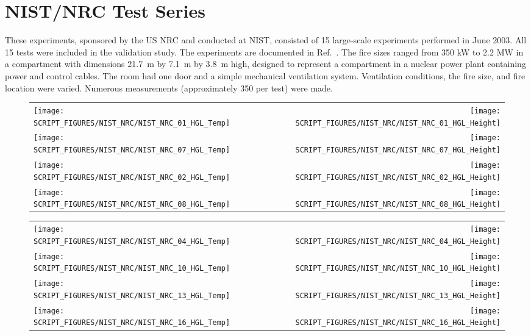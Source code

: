 \clearpage

\section{NIST/NRC Test Series}

These experiments, sponsored by the US NRC and conducted at NIST, consisted of 15 large-scale experiments performed in June 2003. All 15 tests were included in the validation study. The experiments are documented in Ref.~\cite{Hamins:2005}. The fire sizes ranged from 350 kW to 2.2 MW in a compartment with dimensions 21.7~m by 7.1~m by 3.8~m high, designed to represent a compartment in a nuclear power plant containing power and control cables. The room had one door and a simple mechanical ventilation system. Ventilation conditions, the fire size, and fire location were varied. Numerous measurements (approximately 350 per test) were made.

\begin{figure}[p]
\begin{tabular*}{\textwidth}{l@{\extracolsep{\fill}}r}
\texttt{[image: SCRIPT\_FIGURES/NIST\_NRC/NIST\_NRC\_01\_HGL\_Temp]} &
\texttt{[image: SCRIPT\_FIGURES/NIST\_NRC/NIST\_NRC\_01\_HGL\_Height]} \\
\texttt{[image: SCRIPT\_FIGURES/NIST\_NRC/NIST\_NRC\_07\_HGL\_Temp]} &
\texttt{[image: SCRIPT\_FIGURES/NIST\_NRC/NIST\_NRC\_07\_HGL\_Height]} \\
\texttt{[image: SCRIPT\_FIGURES/NIST\_NRC/NIST\_NRC\_02\_HGL\_Temp]} &
\texttt{[image: SCRIPT\_FIGURES/NIST\_NRC/NIST\_NRC\_02\_HGL\_Height]} \\
\texttt{[image: SCRIPT\_FIGURES/NIST\_NRC/NIST\_NRC\_08\_HGL\_Temp]} &
\texttt{[image: SCRIPT\_FIGURES/NIST\_NRC/NIST\_NRC\_08\_HGL\_Height]}
\end{tabular*}
\end{figure}

\begin{figure}[p]
\begin{tabular*}{\textwidth}{l@{\extracolsep{\fill}}r}
\texttt{[image: SCRIPT\_FIGURES/NIST\_NRC/NIST\_NRC\_04\_HGL\_Temp]} &
\texttt{[image: SCRIPT\_FIGURES/NIST\_NRC/NIST\_NRC\_04\_HGL\_Height]} \\
\texttt{[image: SCRIPT\_FIGURES/NIST\_NRC/NIST\_NRC\_10\_HGL\_Temp]} &
\texttt{[image: SCRIPT\_FIGURES/NIST\_NRC/NIST\_NRC\_10\_HGL\_Height]} \\
\texttt{[image: SCRIPT\_FIGURES/NIST\_NRC/NIST\_NRC\_13\_HGL\_Temp]} &
\texttt{[image: SCRIPT\_FIGURES/NIST\_NRC/NIST\_NRC\_13\_HGL\_Height]} \\
\texttt{[image: SCRIPT\_FIGURES/NIST\_NRC/NIST\_NRC\_16\_HGL\_Temp]} &
\texttt{[image: SCRIPT\_FIGURES/NIST\_NRC/NIST\_NRC\_16\_HGL\_Height]}
\end{tabular*}
\end{figure}


